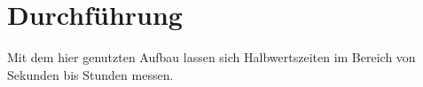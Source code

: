 \newpage
\section{Durchführung}
\label{sec:Durchfuehrung}
Mit dem hier genutzten Aufbau lassen sich Halbwertszeiten im Bereich von Sekunden bis Stunden messen.
